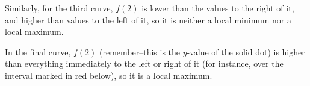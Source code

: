\begin{solution}
Similarly, for the third curve, $f(2)$ is lower than the values to the right of it, and higher than values to the left of it, so it is neither a local minimum nor a local maximum.

In the final curve, $f(2)$ (remember--this is the $y$-value of the solid dot) is higher than everything immediately to the left or right of it (for instance, over the interval marked in red below), so it is a local maximum.
\begin{center}
\end{center}
\end{solution}

